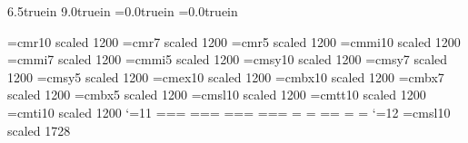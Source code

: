 %
\hsize 6.5truein
\vsize 9.0truein
\hoffset=0.0truein
\voffset=0.0truein

%
\font\tenrm  =cmr10  scaled 1200
\font\sevenrm=cmr7   scaled 1200
\font\fiverm =cmr5   scaled 1200
\font\teni   =cmmi10 scaled 1200
\font\seveni =cmmi7  scaled 1200
\font\fivei  =cmmi5  scaled 1200
\font\tensy  =cmsy10 scaled 1200
\font\sevensy=cmsy7  scaled 1200
\font\fivesy =cmsy5  scaled 1200
\font\tenex  =cmex10 scaled 1200
\font\tenbf  =cmbx10 scaled 1200
\font\sevenbf=cmbx7  scaled 1200
\font\fivebf =cmbx5  scaled 1200
\font\tensl  =cmsl10 scaled 1200
\font\tentt  =cmtt10 scaled 1200
\font\tenit  =cmti10 scaled 1200
%
%
\catcode`\@=11
% 
%
=\tenrm {}=\sevenrm {}=\fiverm
\def\rm{\fam\z@\tenrm}
%
%
=\teni  {}=\seveni  {}=\fivei
\def\mit{\fam\@ne} 
\def\oldstyle{\fam\@ne\teni}
%
%
=\tensy {}=\sevensy {}=\fivesy
\def\cal{\fam\tw@}
%
%
=\tenex {}=\tenex   {}=\tenex
%
%
\newfam\itfam \def\it{\fam\itfam\tenit} 
\textfont\itfam=\tenit
%
%
\newfam\slfam \def\sl{\fam\slfam\tensl} 
\textfont\slfam=\tensl
%
%
\newfam\bffam \def\bf{\fam\bffam\tenbf} 
\textfont\bffam=\tenbf \scriptfont\bffam=\sevenbf
\scriptscriptfont\bffam=\fivebf
%
%
\newfam\ttfam \def\tt{\fam\ttfam\tentt} 
\textfont\ttfam=\tentt
%
\catcode`\@=12
\font\bigslant =cmsl10 scaled 1728
%
%
\def\blankline{\par\vskip 12 pt\noindent}
\def\newline{\par\noindent}
\def\blankpar{\par\vskip 12 pt}
\def\refindent{\noindent\hangafter=1 \hangindent 24 pt}
\def\listlist{\advance\leftskip by1.5\parindent
  \everypar={\hangafter=1 \hangindent 54.0pt}}
\def\list{\advance\leftskip by0.5\parindent
  \everypar={\hangafter=1 \hangindent 36.0pt}}

